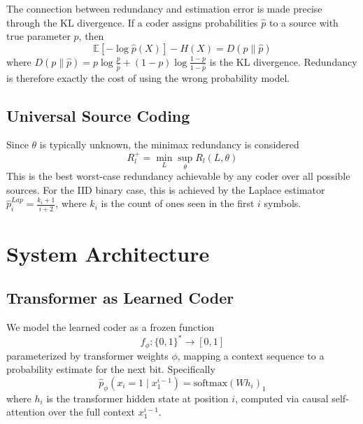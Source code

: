 \documentclass[conference]{IEEEtran}
\begin{document}
The connection between redundancy and estimation error is made precise through the KL divergence. If a coder assigns probabilities $\hat{p}$ to a source with true parameter $p$, then
\begin{equation}
    \mathbb{E}[-\log\hat{p}(X)] - H(X) = D(p\|\hat{p})
\end{equation}
where $D(p\|\hat{p}) = p\log\frac{p}{\hat{p}} + (1-p)\log\frac{1-p}{1-\hat{p}}$ is the KL divergence. Redundancy is therefore exactly the cost of using the wrong probability model.

\subsection{Universal Source Coding}

Since $\theta$ is typically unknown, the minimax redundancy is considered
\begin{equation}
    R^+_l = \min_L \sup_\theta R_l(L, \theta)
\end{equation}
This is the best worst-case redundancy achievable by any coder over all possible sources. For the IID binary case, this is achieved by the Laplace estimator $\hat{p}^{Lap}_i = \frac{k_i + 1}{i + 2}$, where $k_i$ is the count of ones seen in the first $i$ symbols. 

\section{System Architecture}

\subsection{Transformer as Learned Coder}

We model the learned coder as a frozen function
\begin{equation}
    f_\phi: \{0,1\}^* \to [0,1]
\end{equation}
parameterized by transformer weights $\phi$, mapping a context sequence to a probability estimate for the next bit. Specifically
\begin{equation}
    \hat{p}_\phi(x_i = 1 \mid x_1^{i-1}) = \text{softmax}(W h_i)_1
\end{equation}
where $h_i$ is the transformer hidden state at position $i$, computed via causal self-attention over the full context $x_1^{i-1}$.
\end{document}
